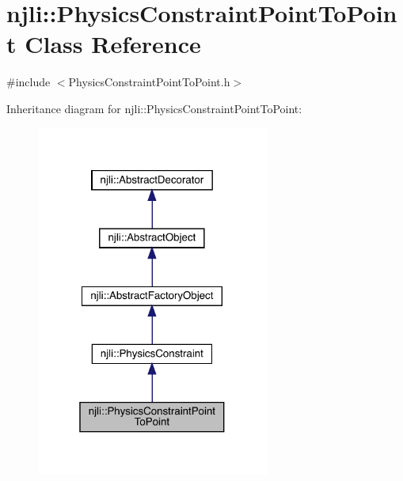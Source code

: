 \hypertarget{classnjli_1_1_physics_constraint_point_to_point}{}\section{njli\+:\+:Physics\+Constraint\+Point\+To\+Point Class Reference}
\label{classnjli_1_1_physics_constraint_point_to_point}


{\ttfamily \#include $<$Physics\+Constraint\+Point\+To\+Point.\+h$>$}



Inheritance diagram for njli\+:\+:Physics\+Constraint\+Point\+To\+Point\+:\nopagebreak
\begin{figure}[H]
\begin{center}
\leavevmode
\includegraphics[width=217pt]{classnjli_1_1_physics_constraint_point_to_point__inherit__graph}
\end{center}
\end{figure}


